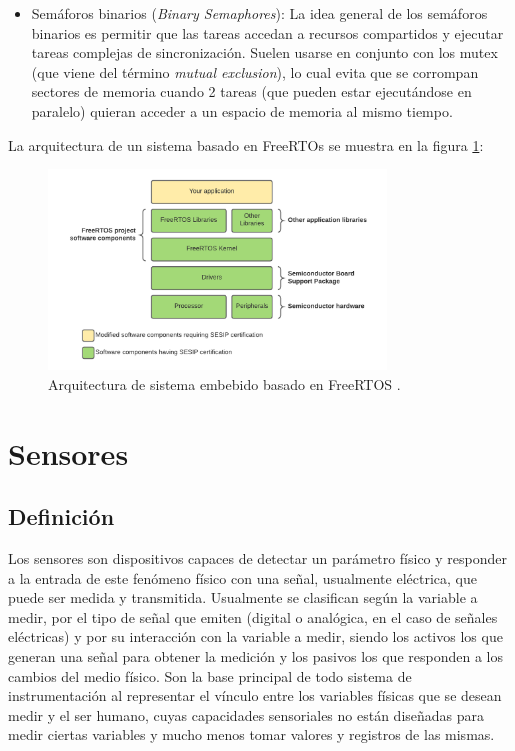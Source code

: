 \begin{itemize}
    \item Semáforos binarios (\textit{Binary Semaphores}): La idea general de los semáforos binarios es permitir que las tareas accedan a recursos compartidos y ejecutar tareas complejas de sincronización. Suelen usarse en conjunto con los mutex (que viene del término \textit{mutual exclusion}), lo cual evita que se corrompan sectores de memoria cuando 2 tareas (que pueden estar ejecutándose en paralelo) quieran acceder a un espacio de memoria al mismo tiempo.
\end{itemize}

La arquitectura de un sistema basado en FreeRTOs se muestra en la figura \ref{fig:rtos}:

\begin{figure}[H]
    \centering
    \includegraphics[width = 0.8\textwidth]{imagenes/cap1_marcoteo/FreeRTOSArch.png}
    \caption{Arquitectura de sistema embebido basado en FreeRTOS \citep{rtos}.}
    \label{fig:rtos}
\end{figure}

\section{Sensores}

\subsection{Definición}

Los sensores son dispositivos capaces de detectar un parámetro físico y responder a la entrada de este fenómeno físico con una señal, usualmente eléctrica, que puede ser medida y transmitida. Usualmente se clasifican según la variable a medir, por el tipo de señal que emiten (digital o analógica, en el caso de señales eléctricas) y por su interacción con la variable a medir, siendo los activos los que generan una señal para obtener la medición y los pasivos los que responden a los cambios del medio físico. Son la base principal de todo sistema de instrumentación al representar el vínculo entre los variables físicas que se desean medir y el ser humano, cuyas capacidades sensoriales no están diseñadas para medir ciertas variables y mucho menos tomar valores y registros de las mismas.


